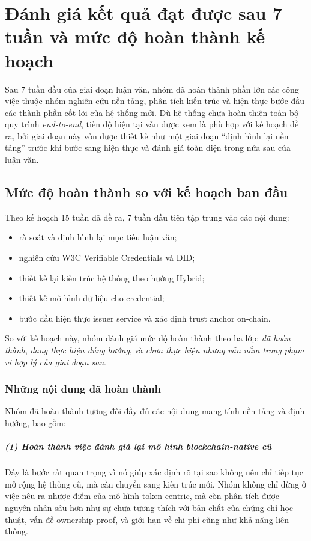 \chapter{Đánh giá kết quả đạt được sau 7 tuần và mức độ hoàn thành kế hoạch}

Sau 7 tuần đầu của giai đoạn luận văn, nhóm đã hoàn thành phần lớn các công việc thuộc nhóm nghiên cứu nền tảng, phân tích kiến trúc và hiện thực bước đầu các thành phần cốt lõi của hệ thống mới. Dù hệ thống chưa hoàn thiện toàn bộ quy trình \textit{end-to-end}, tiến độ hiện tại vẫn được xem là phù hợp với kế hoạch đề ra, bởi giai đoạn này vốn được thiết kế như một giai đoạn ``định hình lại nền tảng'' trước khi bước sang hiện thực và đánh giá toàn diện trong nửa sau của luận văn.

\section{Mức độ hoàn thành so với kế hoạch ban đầu}

Theo kế hoạch 15 tuần đã đề ra, 7 tuần đầu tiên tập trung vào các nội dung:
\begin{itemize}
    \item rà soát và định hình lại mục tiêu luận văn;
    \item nghiên cứu W3C Verifiable Credentials và DID;
    \item thiết kế lại kiến trúc hệ thống theo hướng Hybrid;
    \item thiết kế mô hình dữ liệu cho credential;
    \item bước đầu hiện thực issuer service và xác định trust anchor on-chain.
\end{itemize}

So với kế hoạch này, nhóm đánh giá mức độ hoàn thành theo ba lớp: \textit{đã hoàn thành}, \textit{đang thực hiện đúng hướng}, và \textit{chưa thực hiện nhưng vẫn nằm trong phạm vi hợp lý của giai đoạn sau}.

\subsection{Những nội dung đã hoàn thành}
Nhóm đã hoàn thành tương đối đầy đủ các nội dung mang tính nền tảng và định hướng, bao gồm:

\paragraph{(1) Hoàn thành việc đánh giá lại mô hình blockchain-native cũ}
Đây là bước rất quan trọng vì nó giúp xác định rõ tại sao không nên chỉ tiếp tục mở rộng hệ thống cũ, mà cần chuyển sang kiến trúc mới. Nhóm không chỉ dừng ở việc nêu ra nhược điểm của mô hình token-centric, mà còn phân tích được nguyên nhân sâu hơn như sự chưa tương thích với bản chất của chứng chỉ học thuật, vấn đề ownership proof, và giới hạn về chi phí cũng như khả năng liên thông.

